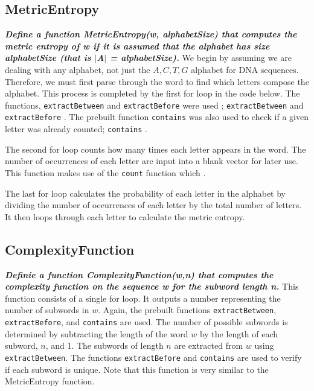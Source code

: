 \documentclass{article}
\begin{document}
\subsection{MetricEntropy}
\textbf{\textit{Define a function MetricEntropy(w, alphabetSize) that computes the metric entropy of w if it is assumed that the alphabet has size alphabetSize (that is $|$A$|$ = alphabetSize).}}
\newline
\newline
We begin by assuming we are dealing with any alphabet, not just the $A, C, T, G$ alphabet for DNA sequences.
Therefore, we must first parse through the word to find which letters compose the alphabet.
This process is completed by the first for loop in the code below.
The functions, \texttt{extractBetween} and \texttt{extractBefore} were used \cite{4}; \texttt{extractBetween}  and \texttt{extractBefore} .
The prebuilt function \texttt{contains} was also used to check if a given letter was already counted; \texttt{contains} \cite{4}.

The second for loop counts how many times each letter appears in the word.
The number of occurrences of each letter are input into a blank vector for later use.
This function makes use of the \texttt{count} function which \cite{4}.

The last for loop calculates the probability of each letter in the alphabet by dividing the number of occurrences of each letter by the total number of letters. 
It then loops through each letter to calculate the metric entropy.
\newline


\subsection{ComplexityFunction}
\textbf{\textit{Definie a function ComplexityFunction(w,n) that computes the complexity function on the sequence w for the subword length n.}}
\newline
\newline
This function consists of a single for loop.
It outputs a number representing the number of subwords in $w$.
Again, the prebuilt functions \texttt{extractBetween}, \texttt{extractBefore}, and \texttt{contains} are used.
The number of possible subwords is determined by subtracting the length of the word $w$ by the length of each subword, $n$, and 1.
The subwords of length $n$ are extracted from $w$ using \texttt{extractBetween}.
The functions \texttt{extractBefore} and \texttt{contains} are used to verify if each subword is unique.
Note that this function is very similar to the MetricEntropy function.
\pagebreak

\end{document}
